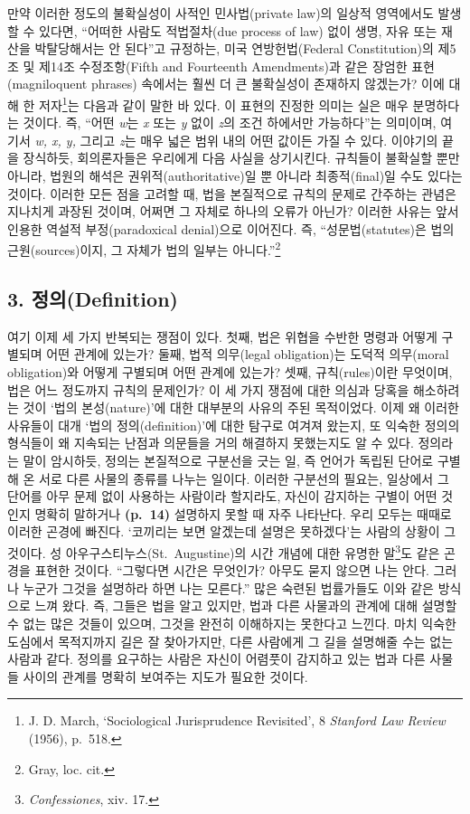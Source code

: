 \documentclass[12pt, oneside]{book}  %
\begin{document}
만약 이러한 정도의 불확실성이 사적인 민사법(private law)의 일상적
영역에서도 발생할 수 있다면, ``어떠한 사람도 적법절차(due process of
law) 없이 생명, 자유 또는 재산을 박탈당해서는 안 된다''고 규정하는, 미국
연방헌법(Federal Constitution)의 제5조 및 제14조 수정조항(Fifth and
Fourteenth Amendments)과 같은 장엄한 표현(magniloquent phrases) 속에서는
훨씬 더 큰 불확실성이 존재하지 않겠는가? 이에 대해 한 저자\footnote{J.
  D. March, `Sociological Jurisprudence Revisited', 8 \emph{Stanford Law
  Review} (1956), p.~518.}는 다음과 같이 말한 바 있다. 이 표현의 진정한
의미는 실은 매우 분명하다는 것이다. 즉, ``어떤 \emph{w}는 \emph{x} 또는
\emph{y} 없이 \emph{z}의 조건 하에서만 가능하다''는 의미이며, 여기서
\emph{w, x, y,} 그리고 \emph{z}는 매우 넓은 범위 내의 어떤 값이든 가질
수 있다. 이야기의 끝을 장식하듯, 회의론자들은 우리에게 다음 사실을
상기시킨다. 규칙들이 불확실할 뿐만 아니라, 법원의 해석은
권위적(authoritative)일 뿐 아니라 최종적(final)일 수도 있다는 것이다.
이러한 모든 점을 고려할 때, 법을 본질적으로 규칙의 문제로 간주하는
관념은 지나치게 과장된 것이며, 어쩌면 그 자체로 하나의 오류가 아닌가?
이러한 사유는 앞서 인용한 역설적 부정(paradoxical denial)으로 이어진다.
즉, ``성문법(statutes)은 법의 근원(sources)이지, 그 자체가 법의 일부는
아니다.''\footnote{Gray, loc. cit.}

\subsection{\texorpdfstring{\textbf{3.
정의(Definition)}}{3. 정의(Definition)}}\label{uxc815uxc758definition}

여기 이제 세 가지 반복되는 쟁점이 있다. 첫째, 법은 위협을 수반한 명령과
어떻게 구별되며 어떤 관계에 있는가? 둘째, 법적 의무(legal obligation)는
도덕적 의무(moral obligation)와 어떻게 구별되며 어떤 관계에 있는가?
셋째, 규칙(rules)이란 무엇이며, 법은 어느 정도까지 규칙의 문제인가? 이
세 가지 쟁점에 대한 의심과 당혹을 해소하려는 것이 `법의 본성(nature)'에
대한 대부분의 사유의 주된 목적이었다. 이제 왜 이러한 사유들이 대개 `법의
정의(definition)'에 대한 탐구로 여겨져 왔는지, 또 익숙한 정의의 형식들이
왜 지속되는 난점과 의문들을 거의 해결하지 못했는지도 알 수 있다.
정의라는 말이 암시하듯, 정의는 본질적으로 구분선을 긋는 일, 즉 언어가
독립된 단어로 구별해 온 서로 다른 사물의 종류를 나누는 일이다. 이러한
구분선의 필요는, 일상에서 그 단어를 아무 문제 없이 사용하는 사람이라
할지라도, 자신이 감지하는 구별이 어떤 것인지 명확히 말하거나
\textbf{(p.~14)} 설명하지 못할 때 자주 나타난다. 우리 모두는 때때로
이러한 곤경에 빠진다. `코끼리는 보면 알겠는데 설명은 못하겠다'는 사람의
상황이 그것이다. 성 아우구스티누스(St.~Augustine)의 시간 개념에 대한
유명한 말\footnote{\emph{Confessiones}, xiv. 17.}도 같은 곤경을 표현한
것이다. ``그렇다면 시간은 무엇인가? 아무도 묻지 않으면 나는 안다. 그러나
누군가 그것을 설명하라 하면 나는 모른다.'' 많은 숙련된 법률가들도 이와
같은 방식으로 느껴 왔다. 즉, 그들은 법을 알고 있지만, 법과 다른 사물과의
관계에 대해 설명할 수 없는 많은 것들이 있으며, 그것을 완전히 이해하지는
못한다고 느낀다. 마치 익숙한 도심에서 목적지까지 길은 잘 찾아가지만,
다른 사람에게 그 길을 설명해줄 수는 없는 사람과 같다. 정의를 요구하는
사람은 자신이 어렴풋이 감지하고 있는 법과 다른 사물들 사이의 관계를
명확히 보여주는 지도가 필요한 것이다.
\end{document}
